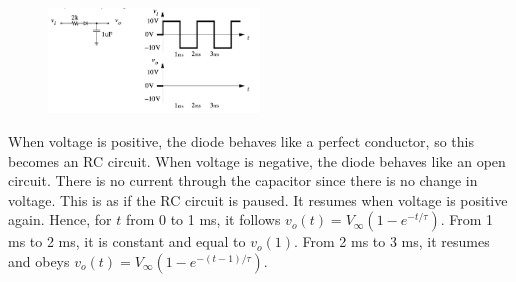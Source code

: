\documentclass[answers]{exam}
\begin{document}
\begin{questions}

\begin{figure}[h]
    \begin{center}
        \includegraphics[width=0.5\textwidth]{q2.png}
    \end{center}
\end{figure}

\begin{solution}
    When voltage is positive, the diode behaves like a perfect conductor, so this becomes an RC circuit. When voltage is negative, the diode behaves like an open circuit. There is no current through the capacitor since there is no change in voltage. This is as if the RC circuit is paused. It resumes when voltage is positive again. Hence, for $t$ from 0 to 1 ms, it follows $v_o(t) = V_\infty\left(1 - e^{-t/\tau}\right)$. From 1 ms to 2 ms, it is constant and equal to $v_o(1)$. From 2 ms to 3 ms, it resumes and obeys $v_o(t) = V_\infty\left(1 - e^{-(t-1)/\tau}\right)$.
\end{solution}

\end{questions}
\end{document}
